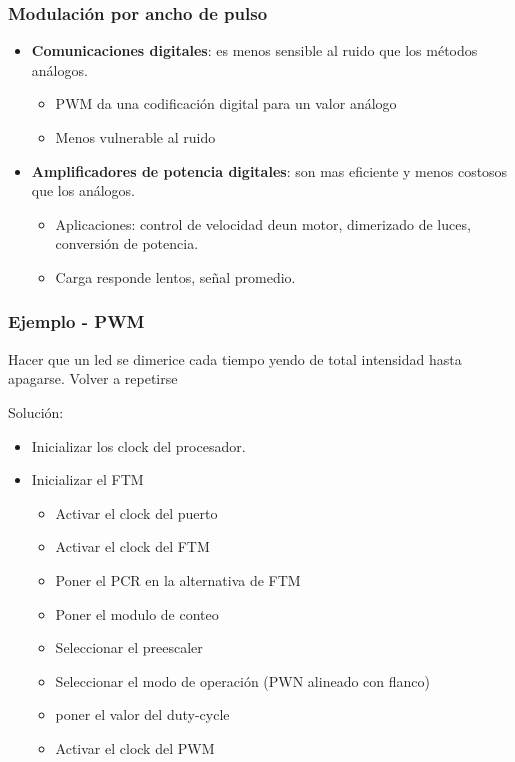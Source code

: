 \documentclass[10.5pt,scale=1.0,t,aspectratio=169,hyperref={pdfpagelabels=false}]{beamer}
\begin{document}
\begin{frame}
	\frametitle{Modulación por ancho de pulso}
	\vspace{-0.3cm}
	{\footnotesize
		\begin{itemize}
			\item \textbf{Comunicaciones digitales}: es menos sensible al ruido que los métodos análogos. 
			\begin{itemize}
				\item PWM da una codificación digital para un valor análogo
				\item Menos vulnerable al ruido
			\end{itemize}
			\item \textbf{Amplificadores de potencia digitales}: son mas eficiente y menos costosos que los análogos. 
			\begin{itemize}
				\item Aplicaciones: control de velocidad deun motor, dimerizado de luces, conversión de potencia.
				\item Carga responde lentos, señal promedio. 
			\end{itemize}
		\end{itemize}
	}
\end{frame}
\begin{frame}
	\frametitle{Ejemplo - PWM}
	\vspace{-0.3cm}
	{\footnotesize
		Hacer que un led se dimerice cada tiempo yendo de total intensidad hasta apagarse. Volver a repetirse
		
		Solución:
		
		\begin{itemize}
			\item Inicializar los clock del procesador.
			\item Inicializar el FTM
			\begin{itemize}
				\item Activar el clock del puerto
				\item Activar el clock del FTM
				\item Poner el PCR en la alternativa de FTM
				\item Poner el modulo de conteo
				\item Seleccionar el preescaler
				\item Seleccionar el modo de operación (PWN alineado con flanco)
				\item poner el valor del duty-cycle
				\item Activar el clock del PWM
			\end{itemize}
		\end{itemize}
	}
\end{frame}
\end{document}

